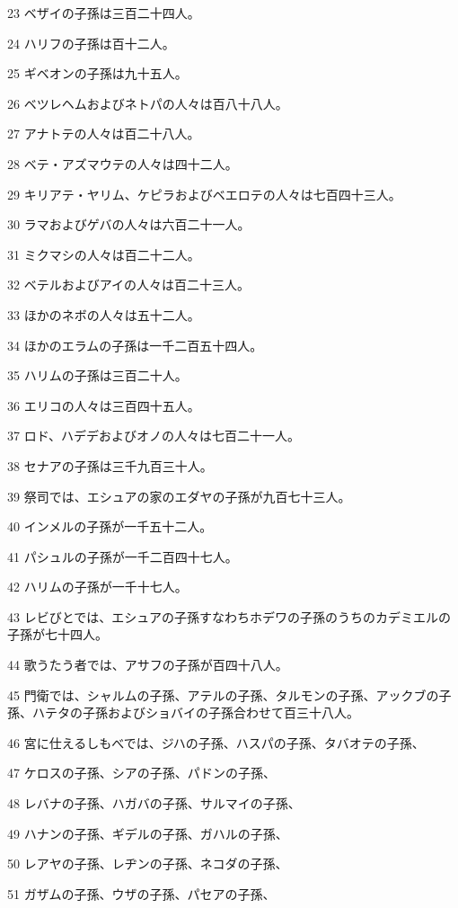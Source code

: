 \par 23 ベザイの子孫は三百二十四人。
\par 24 ハリフの子孫は百十二人。
\par 25 ギベオンの子孫は九十五人。
\par 26 ベツレヘムおよびネトパの人々は百八十八人。
\par 27 アナトテの人々は百二十八人。
\par 28 ベテ・アズマウテの人々は四十二人。
\par 29 キリアテ・ヤリム、ケピラおよびベエロテの人々は七百四十三人。
\par 30 ラマおよびゲバの人々は六百二十一人。
\par 31 ミクマシの人々は百二十二人。
\par 32 ベテルおよびアイの人々は百二十三人。
\par 33 ほかのネボの人々は五十二人。
\par 34 ほかのエラムの子孫は一千二百五十四人。
\par 35 ハリムの子孫は三百二十人。
\par 36 エリコの人々は三百四十五人。
\par 37 ロド、ハデデおよびオノの人々は七百二十一人。
\par 38 セナアの子孫は三千九百三十人。
\par 39 祭司では、エシュアの家のエダヤの子孫が九百七十三人。
\par 40 インメルの子孫が一千五十二人。
\par 41 パシュルの子孫が一千二百四十七人。
\par 42 ハリムの子孫が一千十七人。
\par 43 レビびとでは、エシュアの子孫すなわちホデワの子孫のうちのカデミエルの子孫が七十四人。
\par 44 歌うたう者では、アサフの子孫が百四十八人。
\par 45 門衛では、シャルムの子孫、アテルの子孫、タルモンの子孫、アックブの子孫、ハテタの子孫およびショバイの子孫合わせて百三十八人。
\par 46 宮に仕えるしもべでは、ジハの子孫、ハスパの子孫、タバオテの子孫、
\par 47 ケロスの子孫、シアの子孫、パドンの子孫、
\par 48 レバナの子孫、ハガバの子孫、サルマイの子孫、
\par 49 ハナンの子孫、ギデルの子孫、ガハルの子孫、
\par 50 レアヤの子孫、レヂンの子孫、ネコダの子孫、
\par 51 ガザムの子孫、ウザの子孫、パセアの子孫、
